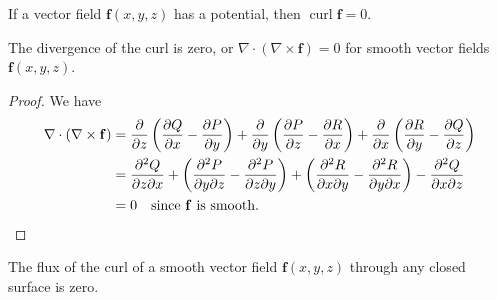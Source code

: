 \begin{cor}
    If a vector field $\mathbf f(x,y,z)$ has a potential, then $\operatorname{curl} \mathbf f=0$.
\end{cor}
\begin{theorem}
    The divergence of the curl is zero, or $\nabla\cdot (\nabla\times \mathbf f)=0$ for smooth vector fields $\mathbf f(x,y,z)$.
\end{theorem}
\begin{proof}
We have 
\begin{align*}
    \nabla \cdot (\nabla \times  \mathbf f) &=  \frac{\partial }{\partial z}\left( \frac{\partial Q}{\partial x}-\frac{\partial P}{\partial y} \right) +\frac{\partial }{\partial y} \left( \frac{\partial P}{\partial z}-\frac{\partial R}{\partial x} \right)+\frac{\partial }{\partial x}\left( \frac{\partial R}{\partial y}-\frac{\partial Q}{\partial z} \right) \\
                                            &=\frac{\partial ^2Q}{\partial z\partial x}+\left( \frac{\partial ^2P}{\partial y\partial z}-\frac{\partial ^2P}{\partial z\partial y} \right) +\left( \frac{\partial ^2R}{\partial x\partial y}-\frac{\partial ^2R}{\partial y\partial x} \right) -\frac{\partial ^2Q}{\partial x\partial z}\\
                                            &=0 \quad \text{since }  \mathbf f \ \text{is smooth.}\qedhere
\end{align*}
\end{proof}
\begin{cor}
    The flux of the curl of a smooth vector field $\mathbf f(x,y,z)$ through any closed surface is zero.
\end{cor}
